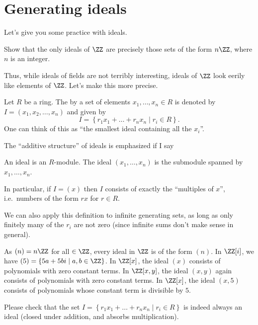\section{Generating ideals}
Let's give you some practice with ideals.

\begin{exercise}
	Show that the only ideals of $\ZZ$ are precisely those
	sets of the form $n\ZZ$, where $n$ is an integer.
\end{exercise}

Thus, while ideals of fields are not terribly interesting,
ideals of $\ZZ$ look eerily like elements of $\ZZ$.
Let's make this more precise.
\begin{definition}
	Let $R$ be a ring.
	The  by a set of elements $x_1, \dots, x_n \in R$
	is denoted by $I = (x_1, x_2, \dots, x_n)$
	and given by
	\[
		I = \left\{ r_1x_1 + \dots + r_nx_n \mid r_i \in R \right\}.
	\]
	One can think of this as ``the smallest ideal containing all the $x_i$''.
\end{definition}
The ``additive structure'' of ideals is emphasized if I say
\begin{moral}
	An ideal is an $R$-module.
	The ideal $(x_1, \dots, x_n)$ is the submodule
	spanned by $x_1, \dots, x_n$.
\end{moral}
In particular, if $I = (x)$ then $I$ consists of exactly the
``multiples of $x$'', i.e.\ numbers of the form $rx$ for $r \in R$.
\begin{remark}
	We can also apply this definition to infinite generating sets, as long as
	only finitely many of the $r_i$ are not zero (since infinite sums
	don't make sense in general).
\end{remark}

\begin{example}
	\listhack
	\begin{enumerate}[(a)]
		\ii As $(n) = n\ZZ$ for all $ \in \ZZ$,
		every ideal in $\ZZ$ is of the form $(n)$.
		\ii In $\ZZ[i]$, we have
		$(5) = \left\{ 5a + 5b i \mid a,b \in \ZZ \right\}$.
		\ii In $\ZZ[x]$, the ideal $(x)$ consists of polynomials
		with zero constant terms.
		\ii In $\ZZ[x,y]$, the ideal $(x,y)$ again consists
		of polynomials with zero constant terms.
		\ii In $\ZZ[x]$, the ideal $(x,5)$ consists of polynomials
		whose constant term is divisible by $5$.
	\end{enumerate}
\end{example}
\begin{ques}
	Please check that the set 
	$I = \left\{ r_1x_1 + \dots + r_nx_n \mid r_i \in R \right\}$
	is indeed always an ideal (closed under addition,
	and absorbs multiplication).
\end{ques}

